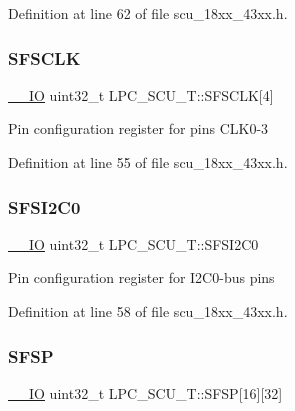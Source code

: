 Definition at line 62 of file scu\+\_\+18xx\+\_\+43xx.\+h.

\mbox{\label{struct_l_p_c___s_c_u___t_a7792d23643372bc1abe03e1f4514ccc8}} 
\subsubsection{\texorpdfstring{S\+F\+S\+C\+LK}{SFSCLK}}
{\footnotesize\ttfamily \hyperlink{core__sc300_8h_aec43007d9998a0a0e01faede4133d6be}{\+\_\+\+\_\+\+IO} uint32\+\_\+t L\+P\+C\+\_\+\+S\+C\+U\+\_\+\+T\+::\+S\+F\+S\+C\+LK\mbox{[}4\mbox{]}}

Pin configuration register for pins C\+L\+K0-\/3 

Definition at line 55 of file scu\+\_\+18xx\+\_\+43xx.\+h.

\mbox{\label{struct_l_p_c___s_c_u___t_a3c16464bcad1a2d724d5b33eacdb6271}} 
\subsubsection{\texorpdfstring{S\+F\+S\+I2\+C0}{SFSI2C0}}
{\footnotesize\ttfamily \hyperlink{core__sc300_8h_aec43007d9998a0a0e01faede4133d6be}{\+\_\+\+\_\+\+IO} uint32\+\_\+t L\+P\+C\+\_\+\+S\+C\+U\+\_\+\+T\+::\+S\+F\+S\+I2\+C0}

Pin configuration register for I2\+C0-\/bus pins 

Definition at line 58 of file scu\+\_\+18xx\+\_\+43xx.\+h.

\mbox{\label{struct_l_p_c___s_c_u___t_abc27b4f4534ed4df86473c8a5d8c953c}} 
\subsubsection{\texorpdfstring{S\+F\+SP}{SFSP}}
{\footnotesize\ttfamily \hyperlink{core__sc300_8h_aec43007d9998a0a0e01faede4133d6be}{\+\_\+\+\_\+\+IO} uint32\+\_\+t L\+P\+C\+\_\+\+S\+C\+U\+\_\+\+T\+::\+S\+F\+SP\mbox{[}16\mbox{]}\mbox{[}32\mbox{]}}



